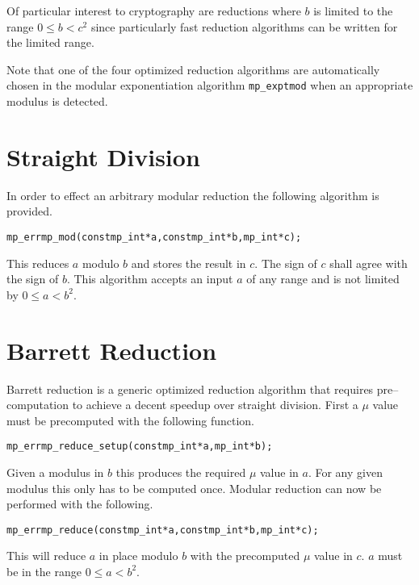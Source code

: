 \documentclass[synpaper]{book}
\begin{document}
Of particular interest to cryptography are reductions where $b$ is limited to the range $0 \le b <
  c^2$ since particularly fast reduction algorithms can be written for the limited range.

Note that one of the four optimized reduction algorithms are automatically chosen in the modular
exponentiation algorithm \texttt{mp\_exptmod} when an appropriate modulus is detected.

\section{Straight Division}
In order to effect an arbitrary modular reduction the following algorithm is provided.

\begin{alltt}
mp_err mp_mod(const mp_int *a,const  mp_int *b, mp_int *c);
\end{alltt}

This reduces $a$ modulo $b$ and stores the result in $c$.  The sign of $c$ shall agree with the
sign of $b$.  This algorithm accepts an input $a$ of any range and is not limited by $0 \le a <
  b^2$.

\section{Barrett Reduction}

Barrett reduction is a generic optimized reduction algorithm that requires pre--computation to
achieve a decent speedup over straight division.  First a $\mu$ value must be precomputed with the
following function.

\begin{alltt}
mp_err mp_reduce_setup(const mp_int *a, mp_int *b);
\end{alltt}

Given a modulus in $b$ this produces the required $\mu$ value in $a$.  For any given modulus this
only has to be computed once.  Modular reduction can now be performed with the following.

\begin{alltt}
mp_err mp_reduce(const mp_int *a, const mp_int *b, mp_int *c);
\end{alltt}

This will reduce $a$ in place modulo $b$ with the precomputed $\mu$ value in $c$.  $a$ must be in
the range
$0 \le a < b^2$.
\end{document}
